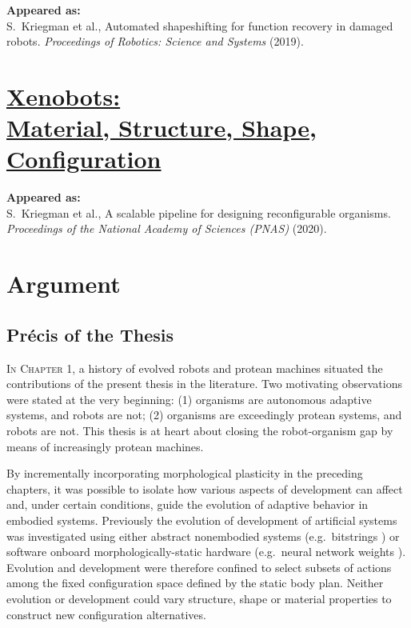 \textbf{Appeared as:}\\
S.~Kriegman et al., Automated shapeshifting for function recovery in damaged robots. \textit{Proceedings of Robotics: Science and Systems} (2019).


\chapter[Xenobots: Material, Structure, Shape, Configuration]{\href{https://www.pnas.org/content/117/4/1853}{\color{blue}Xenobots: \\ {\LARGE Material, Structure, Shape, Configuration}}}

\textbf{Appeared as:}\\
S.~Kriegman et al., A scalable pipeline for designing reconfigurable organisms. 
\textit{Proceedings of the National Academy of Sciences (PNAS)} (2020).





\chapter{Argument}


\section{Pr\'{e}cis of the Thesis}

\textsc{In Chapter 1,}
a history of 
evolved robots 
and protean machines 
situated the contributions of the present thesis in the literature.
Two motivating observations were stated at the very beginning:
(1) organisms are autonomous adaptive systems, and robots are not;
(2) organisms are exceedingly protean systems, and robots are not.
This thesis is at heart about closing the robot-organism gap by means of increasingly protean machines.


By incrementally incorporating morphological plasticity in the preceding chapters, it was possible to isolate how various aspects of development can affect and, under certain conditions, guide the evolution of adaptive behavior in embodied systems.
Previously the evolution of development of artificial systems was investigated using either abstract nonembodied systems (e.g.~bitstrings \cite{hinton1987learning})
or software onboard morphologically-static hardware
(e.g.~neural network weights \cite{husbands1998better,floreano1996plastic}).
Evolution and development were therefore confined to select subsets of actions among the fixed configuration space defined by the static body plan.
Neither evolution or development could vary structure, shape or material properties to construct new configuration alternatives.

